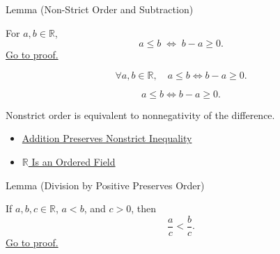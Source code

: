 \begin{lemmabox}{Lemma (Non-Strict Order and Subtraction)}
\begin{lemma}\label{lem:non-strict-order-and-subtraction}
For $a,b\in\mathbb{R}$,
\[
a\le b \;\Longleftrightarrow\; b-a\ge 0.
\]
\hyperref[prf:non-strict-order-and-subtraction]{Go to proof.}
\end{lemma}
\end{lemmabox}

\begin{remark*}
\[
\forall a,b\in\mathbb{R},\quad a\le b\Longleftrightarrow b-a\ge0.
\]
\end{remark*}

\begin{remark*}
\[
a\le b\Longleftrightarrow b-a\ge0.
\]
\end{remark*}

\begin{remark*}[Interpretation]
Nonstrict order is equivalent to nonnegativity of the difference.
\end{remark*}

\begin{dependencies}
\begin{itemize}
  \item \hyperref[thm:ineq-nonstrict-add-both-sides]{Addition Preserves Nonstrict Inequality}
  \item \hyperref[thm:r-is-an-ordered-field]{$\mathbb{R}$ Is an Ordered Field}
\end{itemize}
\end{dependencies}

\begin{lemmabox}{Lemma (Division by Positive Preserves Order)}
\begin{lemma}\label{lem:division-by-positive-preserves-order}
If $a,b,c\in\mathbb{R}$, $a<b$, and $c>0$, then
\[
\frac ac<\frac bc.
\]
\hyperref[prf:division-by-positive-preserves-order]{Go to proof.}
\end{lemma}
\end{lemmabox}

